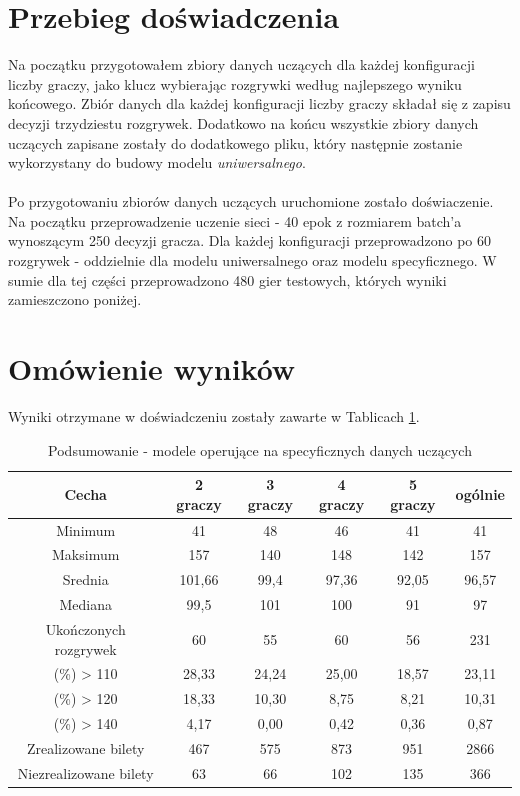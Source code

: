 \documentclass[12pt, oneside]{report}
\begin{document}
\section{Przebieg doświadczenia}
Na początku przygotowałem zbiory danych uczących dla każdej konfiguracji liczby graczy, jako klucz wybierając rozgrywki według najlepszego wyniku końcowego. Zbiór danych dla każdej konfiguracji liczby graczy składał się z zapisu decyzji trzydziestu rozgrywek. Dodatkowo na końcu wszystkie zbiory danych uczących zapisane zostały do dodatkowego pliku, który następnie zostanie wykorzystany do budowy modelu \textit{uniwersalnego}. \\ \\
Po przygotowaniu zbiorów danych uczących uruchomione zostało doświaczenie. Na początku przeprowadzenie uczenie sieci - 40 epok z rozmiarem batch'a wynoszącym 250 decyzji gracza. Dla każdej konfiguracji przeprowadzono po 60 rozgrywek - oddzielnie dla modelu uniwersalnego oraz modelu specyficznego. W sumie dla tej części przeprowadzono 480 gier testowych, których wyniki zamieszczono poniżej.
\section{Omówienie wyników}
Wyniki otrzymane w doświadczeniu zostały zawarte w Tablicach \ref{table:nn_single_test}.
\begin{table}[h]
	\begin{center}
		\begin{tabular}{| c | c | c | c | c | c |} \hline
			Cecha & 2 graczy & 3 graczy & 4 graczy & 5 graczy & ogólnie \\ \hline
			Minimum & 41 & 48 & 46 & 41 & 41 \\ \hline
			Maksimum & 157 & 140 & 148 & 142 & 157 \\ \hline
			Srednia & 101,66 & 99,4 & 97,36 & 92,05 & 96,57 \\ \hline
			Mediana & 99,5 & 101 & 100 & 91 & 97 \\ \hline
			Ukończonych rozgrywek & 60 & 55 & 60 & 56 & 231 \\ \hline
			(\%) > 110 & 28,33 & 24,24 & 25,00 & 18,57 & 23,11 \\ \hline
			(\%) > 120 & 18,33 & 10,30 & 8,75 & 8,21 & 10,31 \\ \hline
			(\%) > 140 & 4,17 & 0,00 & 0,42 & 0,36 & 0,87 \\ \hline
			Zrealizowane bilety & 467 & 575 & 873 & 951 & 2866 \\ \hline
			Niezrealizowane bilety & 63 & 66 & 102 & 135 & 366 \\ \hline
		\end{tabular}
		\caption{Podsumowanie - modele operujące na specyficznych danych uczących}
		\label{table:nn_single_test}
	\end{center}
\end{table}
\end{document}
